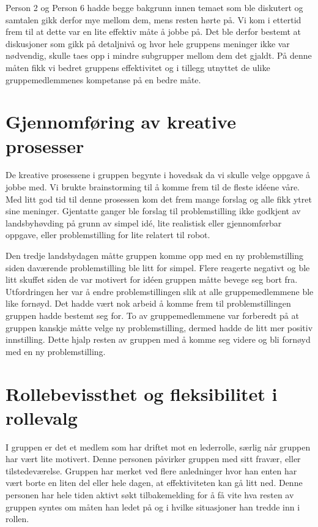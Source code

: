 Person 2 og Person 6 hadde begge bakgrunn innen temaet som ble diskutert og samtalen gikk derfor mye mellom dem, mens resten hørte på. Vi kom i ettertid frem til at dette var en lite effektiv måte å jobbe på. Det ble derfor bestemt at diskusjoner som gikk på detaljnivå og hvor hele gruppens meninger ikke var nødvendig, skulle taes opp i mindre subgrupper mellom dem det gjaldt. På denne måten fikk vi bedret gruppens effektivitet og i tillegg utnyttet de ulike gruppemedlemmenes kompetanse på en bedre måte. 

\section{Gjennomføring av kreative prosesser}
De kreative prosessene i gruppen begynte i hovedsak da vi skulle velge oppgave å jobbe med. Vi brukte brainstorming til å komme frem til de fleste idéene våre. Med litt god tid til denne prosessen kom det frem mange forslag og alle fikk ytret sine meninger. Gjen\-tatte ganger ble forslag til problemstilling ikke godkjent av landsbyhøvding på grunn av simpel idé, lite realistisk eller gjennomførbar oppgave, eller problemstilling for lite relatert til robot. 

Den tredje landsbydagen måtte gruppen komme opp med en ny problemstilling siden daværende problemstilling ble litt for simpel. Flere reagerte negativt og ble litt skuffet siden de var motivert for idéen gruppen måtte bevege seg bort fra. Utfordringen her var å endre problemstillingen slik at alle gruppemedlemmene ble like fornøyd. Det hadde vært nok arbeid å komme frem til problemstillingen gruppen hadde bestemt seg for. To av gruppemedlemmene var forberedt på at gruppen kanskje måtte velge ny problemstilling, dermed hadde de litt mer positiv innstilling. Dette hjalp resten av gruppen med å komme seg videre og bli fornøyd med en ny problemstilling. 

\section{Rollebevissthet og fleksibilitet i rollevalg}
I gruppen er det et medlem som har driftet mot en lederrolle, særlig når gruppen har vært lite motivert. Denne personen påvirker gruppen med sitt fravær, eller tilstedeværelse. Gruppen har merket ved flere anledninger hvor han enten har vært borte en liten del eller hele dagen, at effektiviteten kan gå litt ned. Denne personen har hele tiden aktivt søkt tilbakemelding for å få vite hva resten av gruppen syntes om måten han ledet på og i hvilke situasjoner han tredde inn i rollen. 


